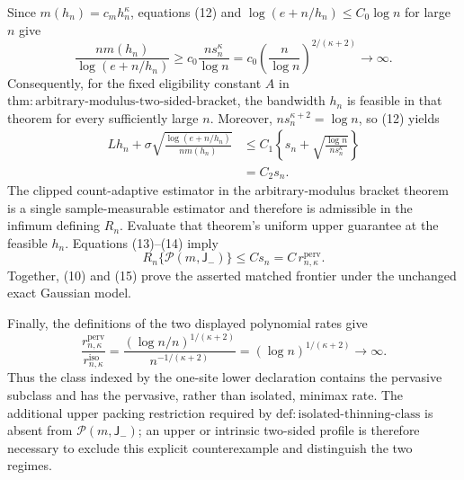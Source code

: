 Since \(m(h_n)=c_mh_n^\kappa\), equations (12) and \(\log(e+n/h_n)\le C_0\log n\) for large \(n\) give
\[
 \frac{nm(h_n)}{\log(e+n/h_n)}
 \ge c_0\frac{ns_n^\kappa}{\log n}
 =c_0\left(\frac n{\log n}\right)^{2/(\kappa+2)}
 \longrightarrow\infty. \tag{13}
\]
Consequently, for the fixed eligibility constant \(A\) in \(\mathrm{thm:arbitrary\text{-}modulus\text{-}two\text{-}sided\text{-}bracket}\), the bandwidth \(h_n\) is feasible in that theorem for every sufficiently large \(n\).  Moreover, \(ns_n^{\kappa+2}=\log n\), so (12) yields
\[
 \begin{aligned}
 Lh_n+\sigma\sqrt{\frac{\log(e+n/h_n)}{nm(h_n)}}
 &\le C_1\left\{s_n+
 \sqrt{\frac{\log n}{ns_n^\kappa}}\right\}\\
 &=C_2s_n. 
 \end{aligned} \tag{14}
\]
The clipped count-adaptive estimator in the arbitrary-modulus bracket theorem is a single sample-measurable estimator and therefore is admissible in the infimum defining \(R_n\).  Evaluate that theorem's uniform upper guarantee at the feasible \(h_n\).  Equations (13)--(14) imply
\[
 R_n\{\mathcal P(m,\mathsf J_{-})\}
 \le C s_n
 =C\,r_{n,\kappa}^{\mathrm{perv}}. \tag{15}
\]
Together, (10) and (15) prove the asserted matched frontier under the unchanged exact Gaussian model.

Finally, the definitions of the two displayed polynomial rates give
\[
 \frac{r_{n,\kappa}^{\mathrm{perv}}}
 {r_{n,\kappa}^{\mathrm{iso}}}
 =\frac{(\log n/n)^{1/(\kappa+2)}}{n^{-1/(\kappa+2)}}
 =(\log n)^{1/(\kappa+2)}
 \longrightarrow\infty. \tag{16}
\]
Thus the class indexed by the one-site lower declaration contains the pervasive subclass and has the pervasive, rather than isolated, minimax rate.  The additional upper packing restriction required by \(\mathrm{def:isolated\text{-}thinning\text{-}class}\) is absent from \(\mathcal P(m,\mathsf J_{-})\); an upper or intrinsic two-sided profile is therefore necessary to exclude this explicit counterexample and distinguish the two regimes.